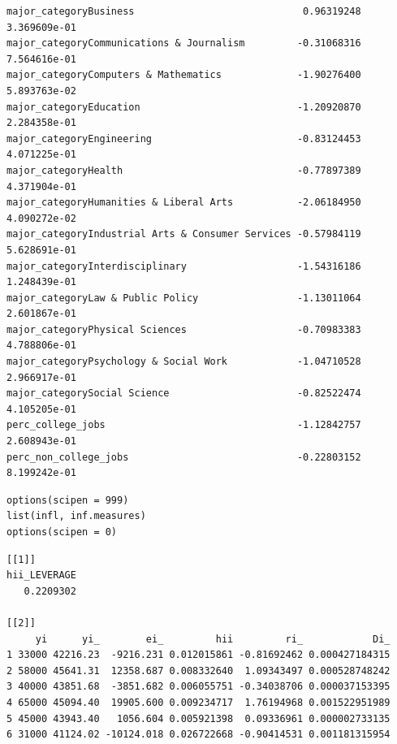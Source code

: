 \documentclass[10pt, twoside, openleft]{article}
\begin{document}
\begin{verbatim}
major_categoryBusiness                             0.96319248 3.369609e-01
major_categoryCommunications & Journalism         -0.31068316 7.564616e-01
major_categoryComputers & Mathematics             -1.90276400 5.893763e-02
major_categoryEducation                           -1.20920870 2.284358e-01
major_categoryEngineering                         -0.83124453 4.071225e-01
major_categoryHealth                              -0.77897389 4.371904e-01
major_categoryHumanities & Liberal Arts           -2.06184950 4.090272e-02
major_categoryIndustrial Arts & Consumer Services -0.57984119 5.628691e-01
major_categoryInterdisciplinary                   -1.54316186 1.248439e-01
major_categoryLaw & Public Policy                 -1.13011064 2.601867e-01
major_categoryPhysical Sciences                   -0.70983383 4.788806e-01
major_categoryPsychology & Social Work            -1.04710528 2.966917e-01
major_categorySocial Science                      -0.82522474 4.105205e-01
perc_college_jobs                                 -1.12842757 2.608943e-01
perc_non_college_jobs                             -0.22803152 8.199242e-01
\end{verbatim}

\begin{verbatim}
options(scipen = 999)
list(infl, inf.measures)
options(scipen = 0)
\end{verbatim}

\begin{verbatim}
[[1]]
hii_LEVERAGE
   0.2209302

[[2]]
     yi      yi_        ei_         hii         ri_            Di_
1 33000 42216.23  -9216.231 0.012015861 -0.81692462 0.000427184315
2 58000 45641.31  12358.687 0.008332640  1.09343497 0.000528748242
3 40000 43851.68  -3851.682 0.006055751 -0.34038706 0.000037153395
4 65000 45094.40  19905.600 0.009234717  1.76194968 0.001522951989
5 45000 43943.40   1056.604 0.005921398  0.09336961 0.000002733135
6 31000 41124.02 -10124.018 0.026722668 -0.90414531 0.001181315954
\end{verbatim}
\end{document}
